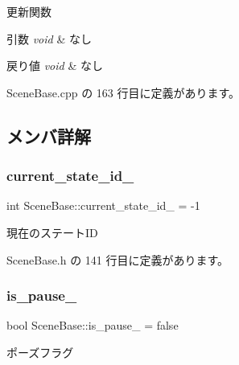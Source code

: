 更新関数 


\begin{DoxyParams}{引数}
{\em void} & なし \\
\hline
\end{DoxyParams}

\begin{DoxyRetVals}{戻り値}
{\em void} & なし \\
\hline
\end{DoxyRetVals}


 Scene\+Base.\+cpp の 163 行目に定義があります。



\subsection{メンバ詳解}
\mbox{\label{class_scene_base_a492dce9ca532ed498d34bc19963e0264}} 
\subsubsection{\texorpdfstring{current\+\_\+state\+\_\+id\+\_\+}{current\_state\_id\_}}
{\footnotesize\ttfamily int Scene\+Base\+::current\+\_\+state\+\_\+id\+\_\+ = -\/1\hspace{0.3cm}{\ttfamily [private]}}



現在のステート\+ID 



 Scene\+Base.\+h の 141 行目に定義があります。

\mbox{\label{class_scene_base_a57b0e6c3c278799a63a330a269f04e21}} 
\subsubsection{\texorpdfstring{is\+\_\+pause\+\_\+}{is\_pause\_}}
{\footnotesize\ttfamily bool Scene\+Base\+::is\+\_\+pause\+\_\+ = false\hspace{0.3cm}{\ttfamily [private]}}



ポーズフラグ 



